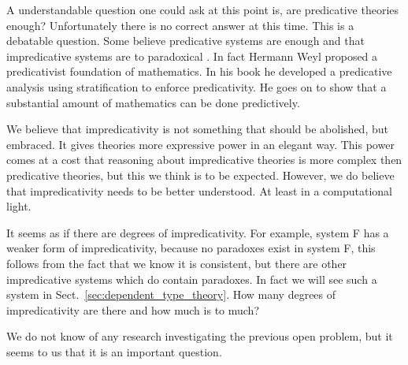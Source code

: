 A understandable question one could ask at this point is, are
predicative theories enough? Unfortunately there is no correct answer
at this time.  This is a debatable question.  Some believe
predicative systems are enough and that impredicative systems are to
paradoxical \cite{Feferman:2005}.  In fact Hermann Weyl proposed a
predicativist foundation of mathematics.  In his book \cite{Weyl:1918}
he developed a predicative analysis using stratification to enforce
predicativity.  He goes on to show that a substantial amount of
mathematics can be done predictively.

We believe that impredicativity is not something that should be
abolished, but embraced.  It gives theories more expressive power in
an elegant way. This power comes at a cost that reasoning about
impredicative theories is more complex then predicative theories, but
this we think is to be expected.  However, we do believe that
impredicativity needs to be better understood.  At least in a
computational light.  

\begin{openproblem}
  It seems as if there are degrees of impredicativity.  For example,
  system F has a weaker form of impredicativity, because no paradoxes
  exist in system F, this follows from the fact that we know it is
  consistent, but there are other impredicative systems which do
  contain paradoxes.  In fact we will see such a system in
  Sect.~\ref{sec:dependent_type_theory}.  How many degrees of
  impredicativity are there and how much is to much?
\end{openproblem}

\noindent
We do not know of any research investigating the previous open problem,
but it seems to us that it is an important question.
